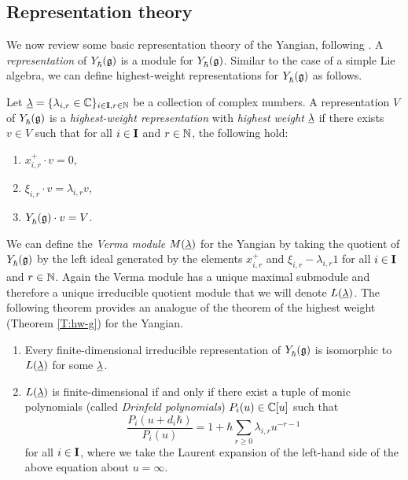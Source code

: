 \subsection{Representation theory}

We now review some basic representation theory of the Yangian, following \cite{chari_guide_1995}.
A \emph{representation} of $Y_\hbar^{}(\mathfrak{g})$ is a module for $Y_\hbar^{}(\mathfrak{g})$.
Similar to the case of a simple Lie algebra, we can define highest-weight representations for $Y_\hbar^{}(\mathfrak{g})$ as follows.

\begin{definition}\label{D:hw-Y}
    Let $\underline{\lambda}=\{\lambda_{i,r}\in\mathbb{C}\}_{i\in\mathbf{I},r\in\mathbb{N}}$ be a collection of complex numbers.
    A representation $V$ of $Y_\hbar^{}(\mathfrak{g})$ is a \emph{highest-weight representation} with \emph{highest weight} $\underline{\lambda}$ if there exists $v\in V$ such that for all $i\in\mathbf{I}$ and $r\in\mathbb{N}$, the following hold:
    \begin{enumerate}
        \item $x^+_{i,r}\cdot v = 0$,
        \item $\xi_{i,r}\cdot v = \lambda_{i,r}v$,
        \item $Y_\hbar^{}(\mathfrak{g})\cdot v = V$.
    \end{enumerate}
\end{definition}

We can define the \emph{Verma module} $M(\underline{\lambda})$ for the Yangian by taking the quotient of $Y_\hbar^{}(\mathfrak{g})$ by the left ideal generated by the elements $x^+_{i,r}$ and $\xi_{i,r}-\lambda_{i,r}1$ for all $i\in\mathbf{I}$ and $r\in\mathbb{N}$.
Again the Verma module has a unique maximal submodule and therefore a unique irreducible quotient module that we will denote $L(\underline{\lambda})$.
The following theorem provides an analogue of the theorem of the highest weight (Theorem \ref{T:hw-g}) for the Yangian.

\begin{theorem}\label{T:hw-Y}
    \begin{enumerate}
        \item Every finite-dimensional irreducible representation of $Y_\hbar^{}(\mathfrak{g})$ is isomorphic to $L(\underline{\lambda})$ for some $\underline{\lambda}$.
        \item $L(\underline{\lambda})$ is finite-dimensional if and only if there exist a tuple of monic polynomials (called \emph{Drinfeld polynomials}) $P_i(u)\in\mathbb{C}[u]$ such that
        \[\frac{P_i(u+d_i\hbar)}{P_i(u)} = 1+\hbar\sum_{r\geq 0}\lambda_{i,r}u^{-r-1}\]
        for all $i\in\mathbf{I}$, where we take the Laurent expansion of the left-hand side of the above equation about $u=\infty$.
    \end{enumerate}
\end{theorem}

